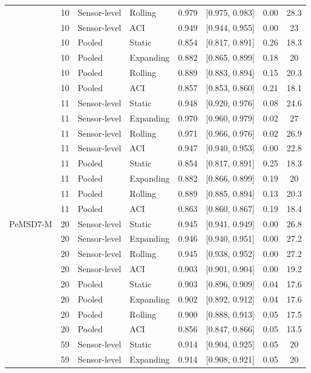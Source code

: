 \begin{table}[htbp]
\begin{tabular}{llllcccc}
 & 10 & Sensor-level & Rolling & 0.979 & [0.975, 0.983] & 0.00 & 28.3 \\
 & 10 & Sensor-level & ACI & 0.949 & [0.944, 0.955] & 0.00 & 23 \\
 & 10 & Pooled & Static & 0.854 & [0.817, 0.891] & 0.26 & 18.3 \\
 & 10 & Pooled & Expanding & 0.882 & [0.865, 0.899] & 0.18 & 20 \\
 & 10 & Pooled & Rolling & 0.889 & [0.883, 0.894] & 0.15 & 20.3 \\
 & 10 & Pooled & ACI & 0.857 & [0.853, 0.860] & 0.21 & 18.1 \\
 & 11 & Sensor-level & Static & 0.948 & [0.920, 0.976] & 0.08 & 24.6 \\
 & 11 & Sensor-level & Expanding & 0.970 & [0.960, 0.979] & 0.02 & 27 \\
 & 11 & Sensor-level & Rolling & 0.971 & [0.966, 0.976] & 0.02 & 26.9 \\
 & 11 & Sensor-level & ACI & 0.947 & [0.940, 0.953] & 0.00 & 22.8 \\
 & 11 & Pooled & Static & 0.854 & [0.817, 0.891] & 0.25 & 18.3 \\
 & 11 & Pooled & Expanding & 0.882 & [0.866, 0.899] & 0.19 & 20 \\
 & 11 & Pooled & Rolling & 0.889 & [0.885, 0.894] & 0.13 & 20.3 \\
 & 11 & Pooled & ACI & 0.863 & [0.860, 0.867] & 0.19 & 18.4 \\
\midrule
PeMSD7-M & 20 & Sensor-level & Static & 0.945 & [0.941, 0.949] & 0.00 & 26.8 \\
 & 20 & Sensor-level & Expanding & 0.946 & [0.940, 0.951] & 0.00 & 27.2 \\
 & 20 & Sensor-level & Rolling & 0.945 & [0.938, 0.952] & 0.00 & 27.2 \\
 & 20 & Sensor-level & ACI & 0.903 & [0.901, 0.904] & 0.00 & 19.2 \\
 & 20 & Pooled & Static & 0.903 & [0.896, 0.909] & 0.04 & 17.6 \\
 & 20 & Pooled & Expanding & 0.902 & [0.892, 0.912] & 0.04 & 17.6 \\
 & 20 & Pooled & Rolling & 0.900 & [0.888, 0.913] & 0.05 & 17.5 \\
 & 20 & Pooled & ACI & 0.856 & [0.847, 0.866] & 0.05 & 13.5 \\
 & 59 & Sensor-level & Static & 0.914 & [0.904, 0.925] & 0.05 & 20 \\
 & 59 & Sensor-level & Expanding & 0.914 & [0.908, 0.921] & 0.05 & 20 \\

\end{tabular}
\end{table}
